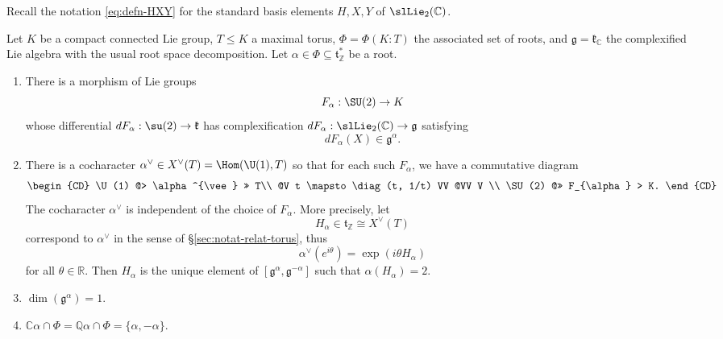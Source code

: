 \documentclass[reqno]{amsart} 
\begin{document}
Recall the notation \eqref{eq:defn-HXY} for the standard basis elements $H,X,Y$ of $\slLie_2(\mathbb{C})$.
\begin{theorem}\label{thm:from-roots-dist-su2}
  Let $K$ be a compact connected Lie group, $T \leq K$ a maximal torus, $\Phi = \Phi(K:T)$ the associated set of roots, and $\mathfrak{g} = \mathfrak{k}_{\mathbb{C}}$ the complexified Lie algebra with the usual root space decomposition.  Let $\alpha \in \Phi \subseteq \mathfrak{t}_{\mathbb{Z}}^*$ be a root.
  \begin{enumerate}
  \item There is a morphism of Lie groups
    \begin{equation*}
      F_\alpha : \SU(2) \rightarrow K
    \end{equation*}
    whose differential $d F_\alpha : \su(2) \rightarrow \mathfrak{k}$ has complexification $d F_\alpha : \slLie_2(\mathbb{C}) \rightarrow \mathfrak{g}$ satisfying
    \begin{equation*}
      d F_\alpha (X) \in \mathfrak{g}^\alpha.
    \end{equation*}
  \item There is a cocharacter $\alpha^\vee \in X^\vee(T) = \Hom(\U(1),T)$ so that for each such $F_\alpha$, we have a commutative diagram
    \begin{equation}\label{eq:F-alpha-alpha-vee-commute}
      \begin{CD}         
        \U(1) @> \alpha^{\vee} >> T\\
        @V t \mapsto \diag(t, 1/t) VV  @VV V \\
        \SU(2) @>> F_{\alpha} > K.
      \end{CD}
    \end{equation}
    The cocharacter $\alpha^\vee$ is independent of the choice of $F_\alpha$.  More precisely, let
    \begin{equation*}
      H_\alpha \in \mathfrak{t}_{\mathbb{Z}} \cong X^\vee(T)
    \end{equation*}
    correspond to $\alpha^\vee$ in the sense of \S\ref{sec:notat-relat-torus}, thus
    \begin{equation*}
      \alpha^\vee(e^{i \theta}) = \exp(i \theta H_\alpha)
    \end{equation*}
    for all $\theta \in \mathbb{R}$.  Then $H_\alpha$ is the unique element of $[\mathfrak{g}^{\alpha}, \mathfrak{g}^{-\alpha}]$ such that $\alpha(H_\alpha) = 2$.
  \item $\dim(\mathfrak{g}^\alpha) = 1$.
  \item $\mathbb{C} \alpha \cap \Phi = \mathbb{Q} \alpha \cap \Phi = \{\alpha, - \alpha \}$.

\end{enumerate}
\end{theorem}
\end{document}
